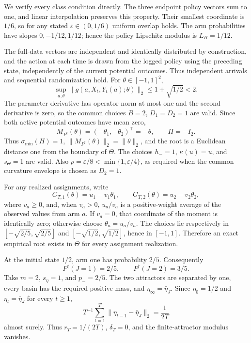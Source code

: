 We verify every class condition directly.  The three endpoint policy vectors sum to one, and linear interpolation preserves this property.  Their smallest coordinate is \(1/6\), so for any stated \(\varepsilon\in(0,1/6)\) uniform overlap holds.  The arm probabilities have slopes \(0,-1/12,1/12\); hence the policy Lipschitz modulus is \(L_\Pi=1/12\).

The full-data vectors are independent and identically distributed by construction, and the action at each time is drawn from the logged policy using the preceding state, independently of the current potential outcomes.  Thus independent arrivals and sequential randomization hold.  For \(\theta\in[-1,1]^2\),
\[
 \sup_{a,\theta}\|g(a,X_t,Y_t(a);\theta)\|_2
 \le1+\sqrt{1/2}<2.
\]
The parameter derivative has operator norm at most one and the second derivative is zero, so the common choices \(B=2\), \(D_1=D_2=1\) are valid.  Since both active potential outcomes have mean zero,
\[
 M_{P^\dagger}(\theta)
 =(-\theta_1,-\theta_2)^\top=-\theta,
 \qquad H=-I_2.                                                           \tag{33}
\]
Thus \(\sigma_{\min}(H)=1\), \(\|M_{P^\dagger}(\theta)\|_2=\|\theta\|_2\), and the root is a Euclidean distance one from the boundary of \(\Theta\).  The choices \(h_-=1\), \(\kappa(u)=u\), and \(s_\Theta=1\) are valid.  Also \(\rho=\varepsilon/8<\min\{1,\varepsilon/4\}\), as required when the common curvature envelope is chosen as \(D_2=1\).

For any realized assignments, write
\[
 G_{T,1}(\theta)=u_1-v_1\theta_1,
 \qquad
 G_{T,2}(\theta)=u_2-v_2\theta_2,
\]
where \(v_a\ge0\), and, when \(v_a>0\), \(u_a/v_a\) is a positive-weight average of the observed values from arm \(a\).  If \(v_a=0\), that coordinate of the moment is identically zero; otherwise choose \(\theta_a=u_a/v_a\).  The choices lie respectively in \([ -\sqrt{2/5},\sqrt{2/5} ]\) and \([ -\sqrt{1/2},\sqrt{1/2} ]\), hence in \([-1,1]\).  Therefore an exact empirical root exists in \(\Theta\) for every assignment realization.

At the initial state \(1/2\), arm one has probability \(2/5\).  Consequently
\[
 P^\dagger(J=1)=2/5,
 \qquad P^\dagger(J=2)=3/5.                                               \tag{34}
\]
Take \(m=2\), \(s_\eta=1\), and \(p_-=2/5\).  The two attractors are separated by one, every basin has the required positive mass, and \(\eta_\infty=\bar\eta_J\).  Since \(\eta_0=1/2\) and \(\eta_t=\bar\eta_J\) for every \(t\ge1\),
\[
 T^{-1}\sum_{t=1}^T\|\eta_{t-1}-\bar\eta_J\|_2=\frac1{2T}              \tag{35}
\]
almost surely.  Thus \(r_T=1/(2T)\), \(\delta_T=0\), and the finite-attractor modulus vanishes.

